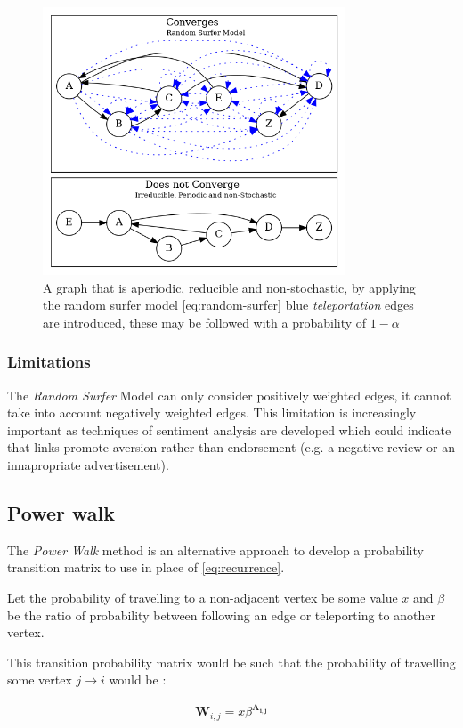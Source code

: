 \documentclass[11pt]{article}
\begin{document}
\begin{figure}[htbp]
\centering
\includegraphics[width=9cm]{media/dot/random_surfer.dot.png}
\caption{\label{fig:rseg}A graph that is aperiodic, reducible and non-stochastic, by applying the random surfer model \eqref{eq:random-surfer} blue \emph{teleportation} edges are introduced, these may be followed with a probability of \(1 - \alpha\)}
\end{figure}
\subsubsection{Limitations}
\label{sec:org48a4665}
The \emph{Random Surfer} Model can only consider positively weighted edges, it cannot
take into account negatively weighted edges. This limitation is increasingly
important as techniques of sentiment analysis are developed which could indicate
that links promote aversion rather than endorsement (e.g. a negative review or
an innapropriate advertisement).
\subsection{Power walk}
\label{pwalk}
The \emph{Power Walk} method is an alternative approach to develop a probability
transition matrix to use in place of \eqref{eq:recurrence}.

Let the probability of travelling to a non-adjacent vertex be some value \(x\)
and \(\beta\) be the ratio of probability between following an edge or
teleporting to another vertex.

This transition probability matrix would be such that the probability of
travelling some vertex \(j \rightarrow i\) would be :

\begin{align}
\mathbf{W}_{i, j} = x\beta^{\mathbf{A_{i,j}}} \label{eq:prob-power-walk}
\end{align}
\end{document}
